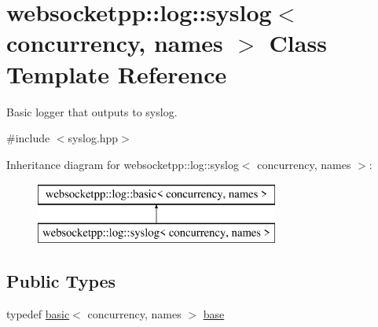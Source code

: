 \hypertarget{classwebsocketpp_1_1log_1_1syslog}{}\section{websocketpp\+:\+:log\+:\+:syslog$<$ concurrency, names $>$ Class Template Reference}
\label{classwebsocketpp_1_1log_1_1syslog}


Basic logger that outputs to syslog.  




{\ttfamily \#include $<$syslog.\+hpp$>$}

Inheritance diagram for websocketpp\+:\+:log\+:\+:syslog$<$ concurrency, names $>$\+:\begin{figure}[H]
\begin{center}
\leavevmode
\includegraphics[height=2.000000cm]{classwebsocketpp_1_1log_1_1syslog}
\end{center}
\end{figure}
\subsection*{Public Types}
\begin{DoxyCompactItemize}
\item 
typedef \hyperlink{classwebsocketpp_1_1log_1_1basic}{basic}$<$ concurrency, names $>$ \hyperlink{classwebsocketpp_1_1log_1_1syslog_af8dc65e20aafdace6b41c36983e6401f}{base}
\end{DoxyCompactItemize}
